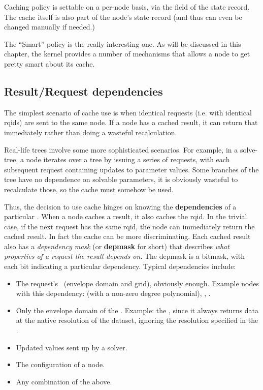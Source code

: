   Caching policy is settable on a per-node basis, via the 
  field of the state record. The cache itself is also part of the node's state
  record (and thus can even be changed manually if needed.)

  The ``Smart'' policy is the really interesting one. As will be discussed
  in this chapter, the kernel provides a number of mechanisms that allows a node
  to get pretty smart about its cache.
  
\subsection{Result/Request dependencies}

  The simplest scenario of cache use is when identical requests (i.e. with
  identical rqids) are sent to the same node. If a node has a cached result, it
  can return that immediately rather than doing a wasteful recalculation.

  Real-life trees involve some more sophisticated scenarios. For example, in a
  solve-tree, a  node iterates over a tree by issuing a series of
  requests, with each subsequent request containing updates to parameter
  values. Some branches of the tree have no dependence on solvable parameters,
  it is obviously wasteful to recalculate those, so the cache must somehow be
  used.

  Thus, the decision to use cache hinges on knowing the {\bf dependencies} of a
  particular . When a node caches a result, it also caches the rqid.
  In the trivial case, if the next request has the same rqid, the node can
  immediately return the cached result. In fact the cache can be more
  discriminating. Each cached result also has a {\em dependency mask} (or {\bf
  depmask} for short) that describes {\em what properties of a request the
  result depends on}. The depmask is a bitmask, with each bit indicating a
  particular dependency. Typical dependencies include:

  \begin{itemize} 
  
  \item The request's \Cells\ (envelope domain and grid), obviously enough.
  Example nodes with this dependency:  (with a non-zero degree
  polynomial), , . 

  \item Only the envelope domain of the \Cells. Example: the , since
  it always returns data at the native resolution of the dataset, ignoring the
  resolution specified in the \Cells.

  \item Updated  values sent up by a solver.
  
  \item The configuration of a  node.

  \item Any combination of the above. 

  \end{itemize}
  
